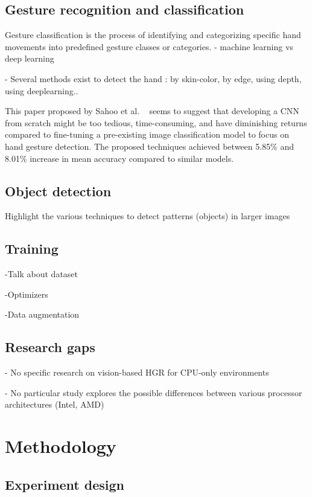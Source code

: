 \documentclass[12pt]{article}
\begin{document}
\subsection{Gesture recognition and classification}

Gesture classification is the process of identifying and categorizing specific hand movements into predefined gesture classes or categories. 
- machine learning vs deep learning

- Several methods exist to detect the hand : by skin-color, by edge, using depth, using deeplearning..

This paper proposed by Sahoo et al. ~\cite{sahoo2022real} seems to suggest that developing a CNN from scratch might be too tedious, time-consuming, and have diminishing returns compared to fine-tuning a pre-existing image classification model to focus on hand gesture detection. The proposed techniques achieved between 5.85\% and 8.01\% increase in mean accuracy compared to similar models.

\subsection{Object detection}

Highlight the various techniques to detect patterns (objects) in larger images

\subsection{Training}

-Talk about dataset

-Optimizers

-Data augmentation

\subsection{Research gaps}

- No specific research on vision-based HGR for CPU-only environments

- No particular study explores the possible differences between various processor architectures (Intel, AMD)

\section{Methodology}

\subsection{Experiment design}
\end{document}
